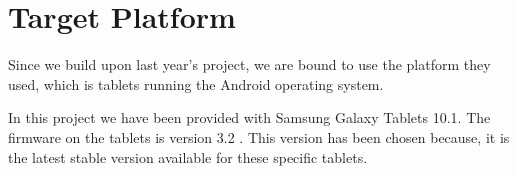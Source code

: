 \section{Target Platform}
Since we build upon last year's project, we are bound to use the platform they used, which is tablets running the Android operating system.

In this project we have been provided with Samsung Galaxy Tablets 10.1\cite{tablet}. The firmware on the tablets is version 3.2 \cite{android32}. This version has been chosen because, it is the latest stable version available for these specific tablets.